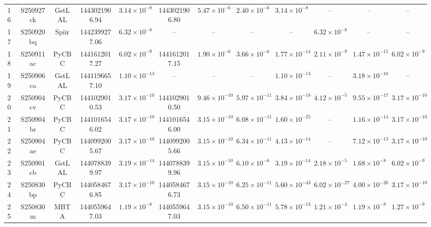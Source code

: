 \begin{table}[ht]
{\begin{tabular}{!{\vrule width 1pt}lccccccccccc!{\vrule width 1pt}}
16 & S250927ck & GstLAL & 1443021906.94 & $3.14 \times 10^{-8}$ & 1443021906.80 & $5.47 \times 10^{-6}$ & $2.40 \times 10^{-6}$ & $3.14 \times 10^{-8}$ & -- & -- & -- \\
17 & S250920bq & Spiir & 1442399277.06 & $6.32 \times 10^{-8}$ & -- & -- & -- & -- & $6.32 \times 10^{-8}$ & -- & -- \\
18 & S250911ac & PyCBC & 1441612017.27 & $6.02 \times 10^{-9}$ & 1441612017.15 & $1.90 \times 10^{-6}$ & $3.66 \times 10^{-6}$ & $1.77 \times 10^{-14}$ & $2.11 \times 10^{-9}$ & $1.47 \times 10^{-15}$ & $6.02 \times 10^{-9}$ \\
19 & S250906ca & GstLAL & 1441196657.10 & $1.10 \times 10^{-13}$ & -- & -- & -- & $1.10 \times 10^{-13}$ & -- & $3.18 \times 10^{-16}$ & -- \\
20 & S250904cv & PyCBC & 1441029010.53 & $3.17 \times 10^{-10}$ & 1441029010.50 & $9.46 \times 10^{-10}$ & $5.97 \times 10^{-11}$ & $3.84 \times 10^{-18}$ & $4.12 \times 10^{-5}$ & $9.55 \times 10^{-17}$ & $3.17 \times 10^{-10}$ \\
21 & S250904br & PyCBC & 1441016546.02 & $3.17 \times 10^{-10}$ & 1441016546.00 & $3.15 \times 10^{-10}$ & $6.08 \times 10^{-11}$ & $1.60 \times 10^{-25}$ & -- & $1.16 \times 10^{-14}$ & $3.17 \times 10^{-10}$ \\
22 & S250904ae & PyCBC & 1440992005.67 & $3.17 \times 10^{-10}$ & 1440992005.66 & $3.15 \times 10^{-10}$ & $6.34 \times 10^{-11}$ & $4.13 \times 10^{-14}$ & -- & $7.12 \times 10^{-13}$ & $3.17 \times 10^{-10}$ \\
23 & S250901cb & GstLAL & 1440788399.97 & $3.19 \times 10^{-14}$ & 1440788399.96 & $3.15 \times 10^{-10}$ & $6.10 \times 10^{-6}$ & $3.19 \times 10^{-14}$ & $2.18 \times 10^{-5}$ & $1.68 \times 10^{-8}$ & $6.02 \times 10^{-9}$ \\
24 & S250830bp & PyCBC & 1440584676.85 & $3.17 \times 10^{-10}$ & 1440584676.73 & $3.15 \times 10^{-10}$ & $6.25 \times 10^{-11}$ & $5.60 \times 10^{-43}$ & $6.02 \times 10^{-27}$ & $4.00 \times 10^{-20}$ & $3.17 \times 10^{-10}$ \\
25 & S250830m & MBTA & 1440559647.03 & $1.19 \times 10^{-8}$ & 1440559647.03 & $3.15 \times 10^{-10}$ & $6.50 \times 10^{-11}$ & $5.78 \times 10^{-13}$ & $1.21 \times 10^{-4}$ & $1.19 \times 10^{-8}$ & $1.27 \times 10^{-9}$ \\
\bottomrule[1pt]
\end{tabular}

}
\end{table}